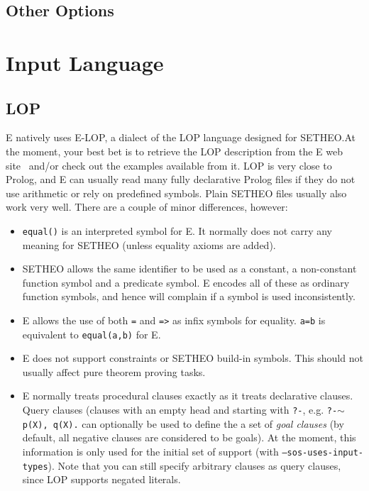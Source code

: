 \documentclass{article}
\begin{document}
\subsection{Other Options}
\label{sec:options:others}


\section{Input Language}
\label{sec:language}

\subsection{LOP}

E natively uses E-LOP, a dialect of the LOP language designed for
SETHEO.At the moment, your best bet is to retrieve the LOP description
from the E web site~\cite{E:WWW-99} and/or check out the examples
available from it.  LOP is very close to Prolog, and E can usually
read many fully declarative Prolog files if they do not use arithmetic
or rely on predefined symbols. Plain SETHEO files usually also work
very well.  There are a couple of minor differences, however:

\begin{itemize}
\item \texttt{equal()} is an interpreted symbol for E. It normally
  does not carry any meaning for SETHEO (unless equality axioms are
  added).
\item SETHEO allows the same identifier to be used as a constant, a
  non-constant function symbol and a predicate symbol. E encodes all
  of these as ordinary function symbols, and hence will complain if a
  symbol is used inconsistently.
\item E allows the use of both \texttt{=} and \texttt{=>} as infix
  symbols for equality. \texttt{a=b} is equivalent to
  \texttt{equal(a,b)} for E.
\item E does not support constraints or SETHEO build-in symbols. This
  should not usually affect pure theorem proving tasks.
\item E normally treats procedural clauses exactly as it treats
  declarative clauses. Query clauses (clauses with an empty head and
  starting with \texttt{?-}, e.g. \texttt{?-$\sim$p(X), q(X).} can
  optionally be used to define the a set of \emph{goal clauses} (by
  default, all negative clauses are considered to be goals). At the
  moment, this information is only used for the initial set of support
  (with \texttt{--sos-uses-input-types}). Note that you can still
  specify arbitrary clauses as query clauses, since LOP supports
  negated literals.
\end{itemize}
\end{document}
